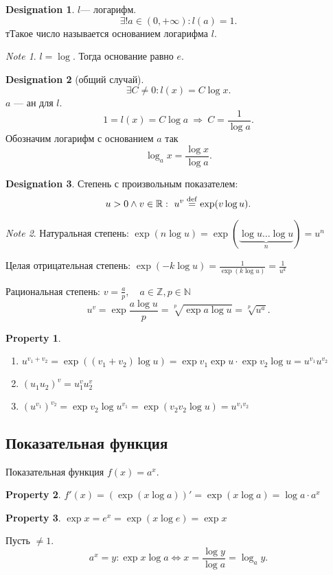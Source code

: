 \documentclass[11pt]{book}
\newcommand{\Z}{\mathbb{Z}}
\newcommand{\N}{\mathbb{N}}
\newcommand{\R}{\mathbb{R}}
\def\mydef{\mathrel{\stackrel{\rm def}=}}
\theoremstyle{definition}
\theoremstyle{plain}
\theoremstyle{plain}
\newtheorem*{prop}{Property}
\theoremstyle{definition}
\newtheorem*{name}{Designation}
\theoremstyle{remark}
\newtheorem*{note}{Note}
\begin{document}
\begin{name}
    $ l $--- логарифм.
    \[
	\exists ! a \in  (0, +\infty): l(a) = 1
    .\]  тТакое число называется основанием логарифма $ l$.
\end{name}
\begin{note}
    $ l = \log$. Тогда основание равно $ e$.
\end{note}
\begin{name}[общий случай]
    \[
	\exists C \ne 0 : l(x) = C \log x
    .\]
    $ a$ --- ан для $ l$.
    \[
	1 = l(x) = C \log a ~ \Longrightarrow  ~ C= \frac{1}{\log a}
    .\]
    Обозначим логарифм с основанием $ a$ так \[
	\log_a x = \frac{\log x}{\log a}
    .\]
\end{name}
\begin{name}
    Степень с произвольным показателем:
    \[
	u>0 \wedge v \in  \R: ~ u^{v} \mydef \exp(v \log u)
    .\]
\end{name}
\begin{note}
    Натуральная степень:
    $ \exp( n \log u) = \exp(\underbrace{\log u \ldots \log u}_{n}) = u ^{ n}$

    Целая отрицательная степень: $ \exp( - k \log u) = \frac{1}{\exp(k \log u)} = \frac{1}{u^{k}}$

    Рациональная степень: $ v = \frac{a}{p}, \quad a \in  \Z, p \in  \N$
    \[
	u ^{ v} = \exp\frac{a \log u}{p} = \sqrt[p]{\exp a \log u} = \sqrt[p]{u^{a}}
    .\]
\end{note}
\begin{prop}
    $ $
    \begin{enumerate}
	\item $ u^{v_1 + v_2} = \exp ((v_1+v_2) \log u) = \exp v_1 \exp u \cdot  \exp v_2 \log u = u ^{v_1} u ^{v_2}$
	\item $ (u_1 u_2)^{v} = u_1^{v} u_2^{v} $
	\item $ {(u^{v_1})}^{v_2} = \exp v_2 \log u ^{ v_1} = \exp (v_2 v_2 \log u) = u ^{ v_1 v_2}$
    \end{enumerate}
\end{prop}
\subsection{Показательная функция}
\begin{defn}
    Показательная функция $ f(x) = a^{x}$.
\end{defn}
\begin{prop}
    $ f'(x) = (\exp (x \log a))' = \exp(x \log a) = \log a \cdot  a^{x}$
\end{prop}
\begin{prop}
    $ \exp x = e^{ x} = \exp(x \log e) = \exp x$
\end{prop}
\begin{defn}
    Пусть $  \ne 1$.  \[
	a^{x} = y: \exp x \log a \Leftrightarrow  x = \frac{\log y}{\log a} = \log_a y
    .\]
\end{defn}
\end{document}
